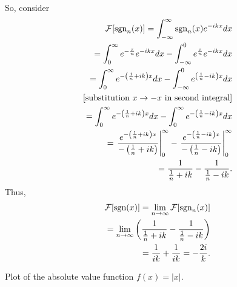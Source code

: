 So, consider
\begin{equation}
\begin{split}
  {\cal F}[\textrm{sgn}_n (x)]= \int_{-\infty}^\infty  \textrm{sgn}_n (x) e^{-i{kx}} dx   \\
  =
\int_{0}^\infty  e^{-\frac{x}{n}} e^{-i{kx}} dx
-
\int_{-\infty}^0  e^{ \frac{x}{n}} e^{-i{kx}} dx
\\
  =
\int_{0}^\infty  e^{-\left(\frac{1}{n}+i{k}\right) x} dx
-
\int_{-\infty}^0  e^{ \left(\frac{1}{n}-i{k}\right) x} dx
\\
[\textrm{substitution }x \rightarrow -x \textrm{ in second integral}]\\
  =
\int_{0}^\infty  e^{-\left(\frac{1}{n}+i{k}\right) x} dx
-
\int_{0}^\infty  e^{-\left(\frac{1}{n}-i{k}\right) x} dx
\\
  =
\left.  \frac{ e^{-\left(\frac{1}{n}+i{k}\right) x}}{{-\left(\frac{1}{n}+i{k}\right)  }} \right|_{0}^\infty
-
\left.  \frac{ e^{-\left(\frac{1}{n}-i{k}\right) x}}{-\left(\frac{1}{n}-i{k}\right)} \right|_{0}^\infty
\\
  =
  \frac{ 1}{  \frac{1}{n}+i{k} }
-
 \frac{ 1 }{ \frac{1}{n}-i{k} }
.
\end{split}
\label{2011-m-ftsgn1a}
\end{equation}
Thus,
\begin{equation}
\begin{split}
{\cal F}[\textrm{sgn}  (x)] =\lim_{n\rightarrow \infty}  {\cal F}[\textrm{sgn}_n (x)]
\\
  =  \lim_{n\rightarrow \infty}  \left(
  \frac{ 1}{ \frac{1}{n}+i{k}   }
-
 \frac{ 1 }{  \frac{1}{n}-i{k}   }          \right)
\\
  =
  \frac{ 1}{   i{k}  }
+
 \frac{ 1 }{  i{k} }
 =
  -\frac{2i}{ k }
.
\end{split}
\label{2011-m-ftsgn1b}
\end{equation}
\fi




\begin{marginfigure}
\begin{center}
\caption{Plot of the absolute value function $f(x)=\left|x\right|$.}
\label{2011-m-avm}
\end{center}
\end{marginfigure}

